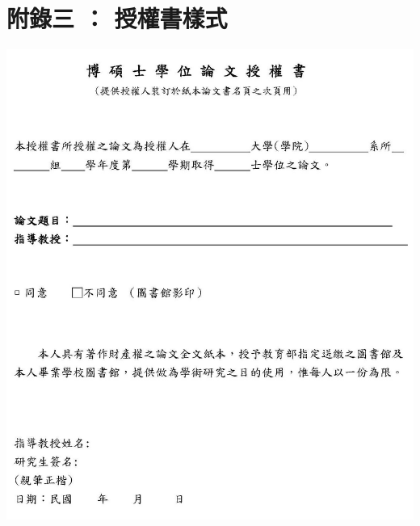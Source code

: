 \chapter{附錄三 ： 授權書樣式}
    \begin{center}
        \includegraphics[bb=0 0 1341 1548,width=\textwidth]{authority.jpg}
    \end{center}

